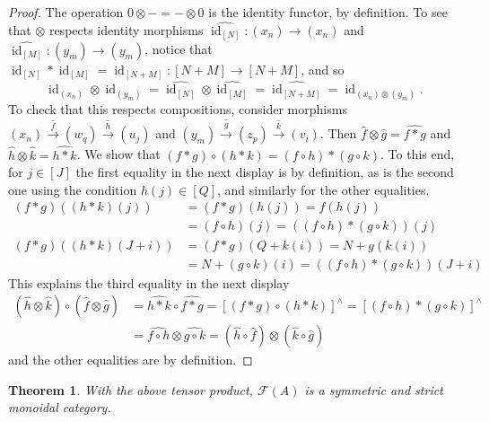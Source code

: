 \documentclass[reqno]{amsart}
\theoremstyle{plain}
\newtheorem{thm}[lem]{Theorem}
\theoremstyle{definition}
\newcommand{\cat}[1]{\mathcal{#1}}
\newcommand{\catf}{\cat{F}}
\newcommand{\id}{\operatorname{id}}
\newcommand{\xra}{\xrightarrow}
\newcommand{\emptytuple}{\mathfrak{0}}
\numberwithin{equation}{lem}
\begin{document}
\begin{proof}
The operation $\emptytuple\otimes-=-\otimes\emptytuple$ is the identity functor, by definition.
To see that $\otimes$ respects identity morphisms $\widehat{\id_{[N]}}\colon(x_n)\to(x_n)$ and $\widehat{\id_{[M]}}\colon(y_m)\to(y_m)$,
notice that $\id_{[N]}*\id_{[M]}=\id_{[N+M]}\colon[N+M]\to[N+M]$, and so 
$$\id_{(x_n)}\otimes\id_{(y_m)}=\widehat{\id_{[N]}}\otimes\widehat{\id_{[M]}}=\widehat{\id_{[N+M]}}=\id_{(x_n)\otimes(y_m)}.$$
To check that this respects compositions, consider morphisms
$(x_n)\xra{\hat f}(w_q)\xra{\hat h}(u_j)$ and $(y_m)\xra{\hat g}(z_p)\xra{\hat k}(v_i)$.
Then $\hat f\otimes\hat g=\widehat{f*g}$ and $\hat h\otimes\hat k=\widehat{h*k}$.
We show that $(f*g)\circ(h*k)=(f\circ h)*(g\circ k)$.
To this end, for $j\in [J]$ the first equality in the next display is by definition,
as is the second one using the condition $h(j)\in [Q]$, and similarly for the other equalities.
\begin{align*}
(f*g)((h*k)(j))
&=(f*g)(h(j))
=f(h(j))\\
&=(f\circ h)(j)
=((f\circ h)*(g\circ k))(j)
\\
(f*g)((h*k)(J+i))
&=(f*g)(Q+k(i))
=N+g(k(i))\\
&=N+(g\circ k)(i)
=((f\circ h)*(g\circ k))(J+i)
\end{align*}
This explains the third equality in the next display
\begin{align*}
(\hat h\otimes\hat k)\circ(\hat f\otimes\hat g)
&=\widehat{h*k}\circ\widehat{f*g}
=[(f*g)\circ (h*k)]^\wedge
=[(f\circ h)*(g\circ k)]^\wedge\\
&=\widehat{f\circ h}\otimes \widehat{g\circ k}
=(\hat h\circ\hat f)\otimes(\hat k\circ\hat g)
\end{align*}
and the other equalities are by definition.
\end{proof}

\begin{thm}\label{prop190106b}
With the above tensor product, $\catf(A)$ is a symmetric and strict monoidal category. 
\end{thm}
\end{document}
